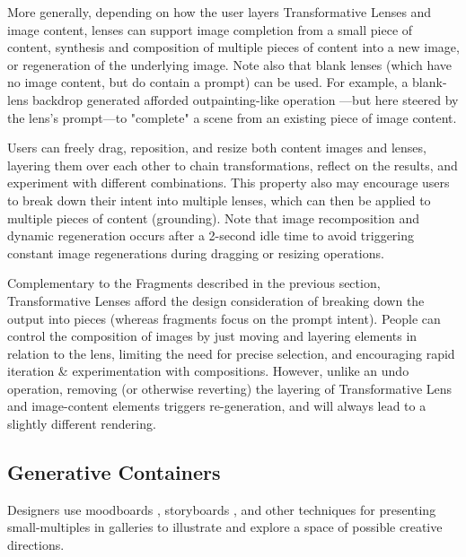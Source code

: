 More generally, depending on how the user layers Transformative Lenses and image content, lenses can support image completion from a small piece of content, synthesis and composition of multiple pieces of content into a new image, or regeneration of the underlying image. Note also that blank lenses (which have no image content, but do contain a prompt) can be used. For example, a blank-lens backdrop generated afforded outpainting-like operation ---but here steered by the lens's prompt---to "complete" a scene from an existing piece of image content. 



Users can freely drag, reposition, and resize both content images and lenses, layering them over each other to chain transformations, reflect on the results, and experiment with different combinations. This property also may encourage users to break down their intent into multiple lenses, which can then be applied to multiple pieces of content (grounding). Note that image recomposition and dynamic regeneration occurs after a 2-second idle time to avoid triggering constant image regenerations during dragging or resizing operations.  



Complementary to the Fragments described in the previous section, Transformative Lenses afford the design consideration of breaking down the output into pieces (whereas fragments focus on the prompt intent). People can control the composition of images by just moving and layering elements in relation to the lens, limiting the need for precise selection, and encouraging rapid iteration \& experimentation with compositions. However, unlike an undo operation, removing (or otherwise reverting) the layering of Transformative Lens and image-content elements triggers re-generation, and will always lead to a slightly different rendering. 




\subsection{Generative Containers}



Designers use moodboards \cite{BuxtonSketchingUserExperiences2007}, storyboards \cite{Storeoboard2016}, and other techniques for presenting small-multiples in  galleries \cite{DesignGalleries1997, TerryCreativeNeedsUIDesign2002, TEAMSTORM2007} to illustrate and explore a space of possible creative directions. 




